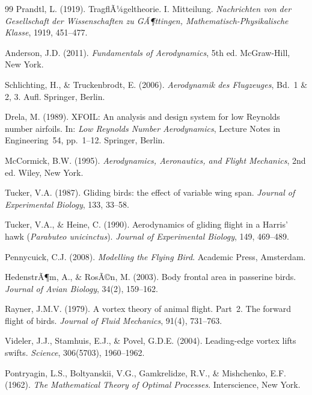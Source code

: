 ﻿\documentclass[12pt,a4paper]{article}
\theoremstyle{remark}
\begin{document}
\begin{thebibliography}{99}
		Prandtl, L. (1919). TragflÃ¼geltheorie. I. Mitteilung. \textit{Nachrichten von der Gesellschaft der Wissenschaften zu GÃ¶ttingen, Mathematisch-Physikalische Klasse}, 1919, 451--477.

		Anderson, J.D. (2011). \textit{Fundamentals of Aerodynamics}, 5th ed. McGraw-Hill, New York.

		Schlichting, H., \& Truckenbrodt, E. (2006). \textit{Aerodynamik des Flugzeuges}, Bd.~1 \& 2, 3. Aufl. Springer, Berlin.

		Drela, M. (1989). XFOIL: An analysis and design system for low Reynolds number airfoils. In: \textit{Low Reynolds Number Aerodynamics}, Lecture Notes in Engineering~54, pp.~1--12. Springer, Berlin.

		McCormick, B.W. (1995). \textit{Aerodynamics, Aeronautics, and Flight Mechanics}, 2nd ed. Wiley, New York.


		Tucker, V.A. (1987). Gliding birds: the effect of variable wing span. \textit{Journal of Experimental Biology}, 133, 33--58.

		Tucker, V.A., \& Heine, C. (1990). Aerodynamics of gliding flight in a Harris' hawk (\textit{Parabuteo unicinctus}). \textit{Journal of Experimental Biology}, 149, 469--489.

		Pennycuick, C.J. (2008). \textit{Modelling the Flying Bird}. Academic Press, Amsterdam.

		HedenstrÃ¶m, A., \& RosÃ©n, M. (2003). Body frontal area in passerine birds. \textit{Journal of Avian Biology}, 34(2), 159--162.

		Rayner, J.M.V. (1979). A vortex theory of animal flight. Part~2. The forward flight of birds. \textit{Journal of Fluid Mechanics}, 91(4), 731--763.

		Videler, J.J., Stamhuis, E.J., \& Povel, G.D.E. (2004). Leading-edge vortex lifts swifts. \textit{Science}, 306(5703), 1960--1962.


		Pontryagin, L.S., Boltyanskii, V.G., Gamkrelidze, R.V., \& Mishchenko, E.F. (1962). \textit{The Mathematical Theory of Optimal Processes}. Interscience, New York.


\end{thebibliography}
\end{document}
